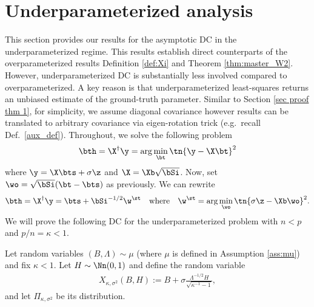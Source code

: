 \section{Underparameterized analysis}\label{SM overdet}

This section provides our results for the asymptotic DC in the underparameterized regime. This results establish direct counterparts of the overparameterized results Definition \ref{def:Xi} and Theorem \ref{thm:master_W2}. However, underparameterized DC is substantially less involved compared to overparameterized. A key reason is that underparameterized least-squares returns an unbiased estimate of the ground-truth parameter. Similar to Section \ref{sec proof thm 1}, for simplicity, we assume diagonal covariance however results can be translated to arbitrary covariance via eigen-rotation trick (e.g.~recall Def.~\ref{aux_def}). Throughout, we solve the following problem%
\begin{align}
\bth=\X^\dagger\y=\arg\min_{\bt} \tn{\y-\X\bt}^2\label{bth up}
\end{align}
where $\y=\X\bts+\sigma\z$ and $\X=\Xb\sqrt{\bSi}$. Now, set $\wo=\sqrt{\bSi}(\bt-\bts)$ as previously. We can rewrite
\begin{align}
\bth=\X^\dagger\y=\bts+\bSi^{-1/2}\w^\st\quad\text{where}\quad \w^\st=\arg\min_{\wo} \tn{\sigma\z-\Xb\wo}^2.\label{wst up}
\end{align}
We will prove the following DC for the underparameterized problem with $n<p$ and $p/n=\kappa<1$.
\begin{definition}\label{def:Xi_under}
Let random variables $(B,\Lambda)\sim \mu$ (where $\mu$ is defined in Assumption \ref{ass:mu}) and fix $\kappa<1$. Let $H\sim\Nn(0,1)$ and define the random variable
\begin{align}
X_{\kappa,\sigma^2}(B,H) :=  B + \sigma\frac{\Lambda^{-1/2}H}{\sqrt{\kappa^{-1}-1}}, \label{eq:X}%
\end{align}
and let $\Pi_{\kappa,\sigma^2}$ be its distribution.
\end{definition}


